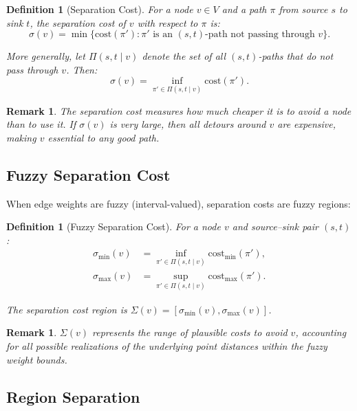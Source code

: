 \documentclass[twocolumn,11pt,a4paper]{article}
\newtheorem{definition}[theorem]{Definition}
\newtheorem{remark}[theorem]{Remark}
\theoremstyle{definition}
\begin{document}
\begin{definition}[Separation Cost]
\label{def:separation_cost}
For a node $v \in V$ and a path $\pi$ from source $s$ to sink $t$, the \emph{separation cost of $v$ with respect to $\pi$} is:
\begin{equation}
\sigma(v) = \min \{ \text{cost}(\pi') : \pi' \text{ is an } (s,t)\text{-path not passing through } v \}.
\end{equation}

More generally, let $\Pi(s, t \mid v)$ denote the set of all $(s,t)$-paths that do not pass through $v$. Then:
\begin{equation}
\sigma(v) = \inf_{\pi' \in \Pi(s,t \mid v)} \text{cost}(\pi').
\end{equation}
\end{definition}

\begin{remark}
The separation cost measures how much cheaper it is to avoid a node than to use it. If $\sigma(v)$ is very large, then all detours around $v$ are expensive, making $v$ essential to any good path.
\end{remark}

\subsection{Fuzzy Separation Cost}

When edge weights are fuzzy (interval-valued), separation costs are fuzzy regions:

\begin{definition}[Fuzzy Separation Cost]
\label{def:fuzzy_separation}
For a node $v$ and source--sink pair $(s, t)$:
\begin{align}
\sigma_{\min}(v) &= \inf_{\pi' \in \Pi(s,t \mid v)} \text{cost}_{\min}(\pi'), \\
\sigma_{\max}(v) &= \sup_{\pi' \in \Pi(s,t \mid v)} \text{cost}_{\max}(\pi').
\end{align}

The \emph{separation cost region} is $\Sigma(v) = [\sigma_{\min}(v), \sigma_{\max}(v)]$.
\end{definition}

\begin{remark}
$\Sigma(v)$ represents the range of plausible costs to avoid $v$, accounting for all possible realizations of the underlying point distances within the fuzzy weight bounds.
\end{remark}

\subsection{Region Separation}
\end{document}
